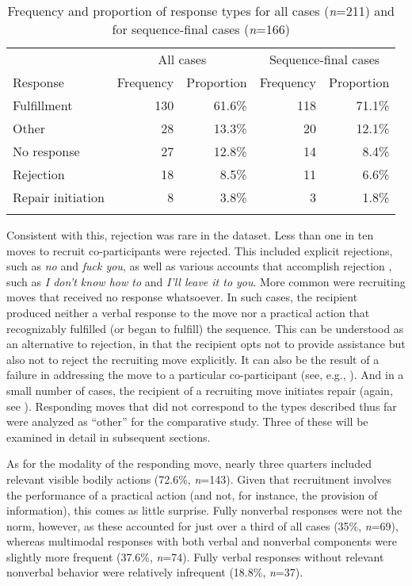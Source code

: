 \documentclass[output=paper,nonflat,modfont,draft]{langsci/langscibook}
\begin{document}
\begin{table}
\begin{tabularx}{\textwidth}{Xrrrr}
\lsptoprule
	& \multicolumn{2}{c}{All cases}& \multicolumn{2}{c}{Sequence-final cases}\\
Response	& Frequency& Proportion	& Frequency& Proportion\\
 \midrule
Fulfillment	& 130	&   61.6\%	& 118	& 71.1\%\\
Other	        & 28	&  13.3\%	& 20	& 12.1\%\\
No response	& 27	&  12.8\%	& 14	& 8.4\%\\
Rejection	& 18	&  8.5\%	& 11	& 6.6\%\\
Repair initiation& 8	&  3.8\%	& 3	& 1.8\%\\
\lspbottomrule
\end{tabularx}

\caption{Frequency and proportion of response types for all cases (\textit{n}=211) and for sequence-final cases (\textit{n}=166)}
\label{tab:kendrick:4}
\end{table}

Consistent with this, rejection was rare in the dataset. Less than one in ten moves to recruit co-participants were rejected. This included explicit rejections, such as \textit{no} and \textit{fuck you}, as well as various accounts that accomplish rejection \citep{Drew1984}, such as \textit{I don’t know how to} and \textit{I’ll leave it to you}. More common were recruiting moves that received no response whatsoever. In such cases, the recipient produced neither a verbal response to the move nor a practical action that recognizably fulfilled (or began to fulfill) the sequence. This can be understood as an alternative to rejection, in that the recipient opts not to provide assistance but also not to reject the recruiting move explicitly. It can also be the result of a failure in addressing the move to a particular co-participant (see, e.g., ). And in a small number of cases, the recipient of a recruiting move initiates repair (again, see ). Responding moves that did not correspond to the types described thus far were analyzed as “other” for the comparative study. Three of these will be examined in detail in subsequent sections.

As for the modality of the responding move, nearly three quarters included relevant visible bodily actions (72.6\%, \textit{n}=143). Given that recruitment involves the performance of a practical action (and not, for instance, the provision of information), this comes as little surprise. Fully nonverbal responses were not the norm, however, as these accounted for just over a third of all cases (35\%, \textit{n}=69), whereas multimodal responses with both verbal and nonverbal components were slightly more frequent (37.6\%, \textit{n}=74). Fully verbal responses without relevant nonverbal behavior were relatively infrequent (18.8\%, \textit{n}=37).
\end{document}
